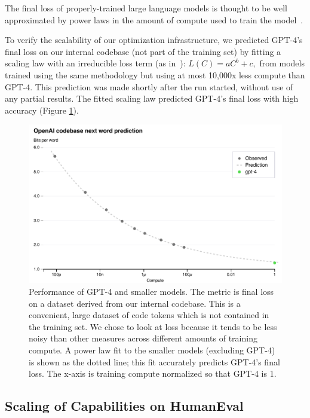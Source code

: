 \documentclass{article}
\begin{document}
The final loss of properly-trained large language models is thought to be well approximated by power laws in the amount of compute used to train the model~\citep{hestness2017deep, thompson2020computational, hoffmann2022training,kaplan2020scaling,henighan2020scaling}.

To verify the scalability of our optimization infrastructure, we predicted GPT-4's final loss on our internal codebase (not part of the training set) by fitting a scaling law with an irreducible loss term (as in~\citet{henighan2020scaling}): $L(C) = aC^b + c,$ from models trained using the same methodology but using at most 10,000x less compute than GPT-4. This prediction was made shortly after the run started, without use of any partial results. The fitted scaling law predicted GPT-4's final loss with high accuracy (Figure \ref{fig:predictable_scaling_loss}). 

\begin{figure}[htbp]
    \centering
    \includegraphics[width=0.8\linewidth]{assets/codebase_loss}
    \caption{Performance of GPT-4 and smaller models. The metric is final loss on a dataset derived from our internal codebase. This is a convenient, large dataset of code tokens which is not contained in the training set. We chose to look at loss because it tends to be less noisy than other measures across different amounts of training compute. A power law fit to the smaller models (excluding GPT-4) is shown as the dotted line; this fit accurately predicts GPT-4's final loss. The x-axis is training compute normalized so that GPT-4 is 1.
    }
    \label{fig:predictable_scaling_loss}
\end{figure}

\subsection{Scaling of Capabilities on HumanEval}
\end{document}
